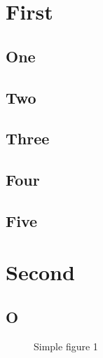 \documentclass{uoflthesis} %
\begin{document}
\tableofcontents


\listoffigures

\mainmatter

\chapter{First}

\section{One}

\lipsum[1-50]

\section{Two}

\lipsum

\section{Three}

\lipsum

\section{Four}

\lipsum

\section{Five}

\lipsum

\chapter{Second}

\section{O}

\lipsum

\begin{figure}
\centering
{}
\caption{Simple figure 1}
\end{figure}
\end{document}
